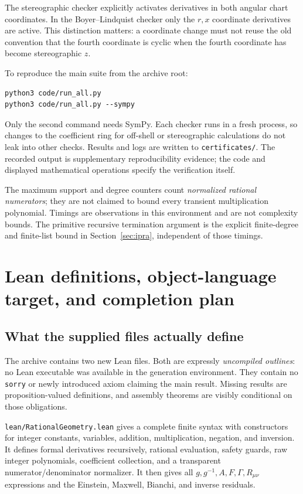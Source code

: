 \documentclass[11pt,a4paper]{article}
\numberwithin{equation}{section}
\theoremstyle{definition}\newtheorem{definition}[theorem]{Definition}
\theoremstyle{remark}\newtheorem{remark}[theorem]{Remark}
\newcommand{\file}[1]{\nolinkurl{#1}}
\begin{document}
The stereographic checker explicitly activates derivatives in both angular chart coordinates. In the Boyer--Lindquist checker only the $r,x$ coordinate derivatives are active. This distinction matters: a coordinate change must not reuse the old convention that the fourth coordinate is cyclic when the fourth coordinate has become stereographic $z$.

To reproduce the main suite from the archive root:
\begin{lstlisting}
python3 code/run_all.py
python3 code/run_all.py --sympy
\end{lstlisting}
Only the second command needs SymPy. Each checker runs in a fresh process, so changes to the coefficient ring for off-shell or stereographic calculations do not leak into other checks. Results and logs are written to \file{certificates/}. The recorded output is supplementary reproducibility evidence; the code and displayed mathematical operations specify the verification itself.



The maximum support and degree counters count \emph{normalized rational numerators}; they are not claimed to bound every transient multiplication polynomial. Timings are observations in this environment and are not complexity bounds. The primitive recursive termination argument is the explicit finite-degree and finite-list bound in Section~\ref{sec:ipra}, independent of those timings.

\section{Lean definitions, object-language target, and completion plan}\label{sec:lean}

\subsection{What the supplied files actually define}
The archive contains two new Lean files. Both are expressly \emph{uncompiled outlines}: no Lean executable was available in the generation environment. They contain no \texttt{sorry} or newly introduced axiom claiming the main result. Missing results are proposition-valued definitions, and assembly theorems are visibly conditional on those obligations.

\file{lean/RationalGeometry.lean} gives a complete finite syntax with constructors for integer constants, variables, addition, multiplication, negation, and inversion. It defines formal derivatives recursively, rational evaluation, safety guards, raw integer polynomials, coefficient collection, and a transparent numerator/denominator normalizer. It then gives all $g,g^{-1},A,F,\Gamma,R_{\mu\nu}$ expressions and the Einstein, Maxwell, Bianchi, and inverse residuals.
\end{document}
